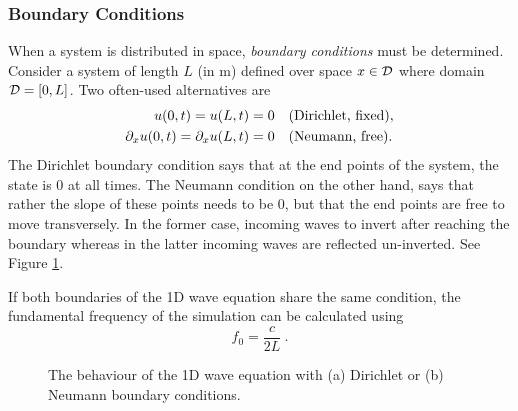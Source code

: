 \subsubsection{Boundary Conditions}
When a system is distributed in space, \textit{boundary conditions} must be determined.
Consider a system  of length $L$ (in m) defined over space $x\in \mathcal{D}$ where domain $\mathcal{D} = [0, L]$. Two often-used alternatives are
%
\begin{subequations}\label{eq:boundaryCond1DWave}
    \begin{align}
        u(0, t) = u(L, t) &= 0\quad \text{(Dirichlet, fixed)},\label{eq:contDirichlet}\\
        \partial_x u(0, t) = \partial_x u(L, t) &= 0\quad \text{(Neumann, free)}.\label{eq:contNeumann}
    \end{align}
\end{subequations}
%
The Dirichlet boundary condition says that at the end points of the system, the state is 0 at all times. The Neumann condition on the other hand, says that rather the slope of these points needs to be 0, but that the end points are free to move transversely. In the former case, incoming waves to invert after reaching the boundary whereas in the latter incoming waves are reflected un-inverted. See Figure \ref{fig:boundaryCondsCont}.

If both boundaries of the 1D wave equation share the same condition, the fundamental frequency of the simulation can be calculated using 
\begin{equation}\label{eq:fundamentalFreq}
    f_0 = \frac{c}{2L}\ .
\end{equation}

\begin{figure}[t]
    \centering
    \hspace{0.06\textwidth}
    \caption{The behaviour of the 1D wave equation with (a) Dirichlet or (b) Neumann boundary conditions.\label{fig:boundaryCondsCont}}
\end{figure}

